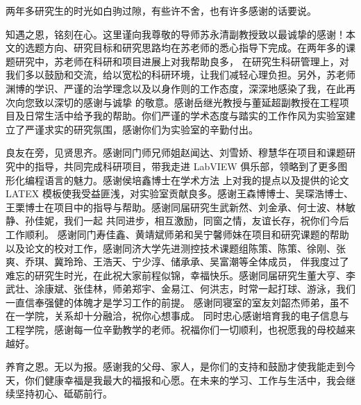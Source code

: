 两年多研究生的时光如白驹过隙，有些许不舍，也有许多感谢的话要说。

知遇之恩，铭刻在心。这里谨向我尊敬的导师苏永清副教授致以最诚挚的感谢！本文的选题方向、研究目标和研究思路均在苏老师的悉心指导下完成。在两年多的课题研究中，苏老师在科研和项目进展上对我帮助良多，
在研究生科研管理上，对我们多以鼓励和交流，给以宽松的科研环境，让我们减轻心理负担。另外，苏老师渊博的学识、严谨的治学理念以及以身作则的工作态度，深深地感染了我，在此再次向您致以深切的感谢与诚挚
的敬意。感谢岳继光教授与董延超副教授在工程项目及日常生活中给予我的帮助。你们严谨的学术态度与踏实的工作作风为实验室建立了严谨求实的研究氛围，感谢你们为实验室的辛勤付出。

良友在旁，见贤思齐。感谢同门师兄师姐赵闻达、刘雪娇、穆慧华在项目和课题研究中的指导，共同完成科研项目，带我走进 LabVIEW 俱乐部，领略到了更多图形化编程语言的魅力。感谢侯培鑫博士在学术方法
上对我的提点以及提供的论文 LATEX 模板使我受益匪浅，对实验室贡献良多。感谢王森博博士、吴琛浩博士、王栗博士在项目中的指导与帮助。感谢同届研究生武新然、刘金承、何士波、林敏静、孙佳妮，我们一起
共同进步，相互激励，同窗之情，友谊长存，祝你们今后工作顺利。
感谢同门寿佳鑫、黄靖斌师弟和吴宁馨师妹在项目和研究课题的帮助以及论文的校对工作，感谢同济大学先进测控技术课题组陈策、陈策、徐刚、张爽、乔琪、冀玲玲、王浩天、宁少淳、储承承、吴富潮等全体成员，
伴我度过了难忘的研究生时光，在此祝大家前程似锦，幸福快乐。感谢同届研究生董大亨、李武壮、涂康斌、张佳林，师弟郑宇、金易江、何洪志，时常一起打球、游泳，我们一直信奉强健的体魄才是学习工作的前提。
感谢同寝室的室友刘韶杰师弟，虽不在一学院，关系却十分融洽，祝你心想事成。
同时忠心感谢培育我的电子信息与工程学院，感谢每一位辛勤教学的老师。祝福你们一切顺利，也祝愿我的母校越来越好。

养育之恩。无以为报。感谢我的父母、家人，是你们的支持和鼓励才使我能走到今天，你们健康幸福是我最大的福报和心愿。在未来的学习、工作与生活中，我会继续坚持初心、砥砺前行。

~~\\


